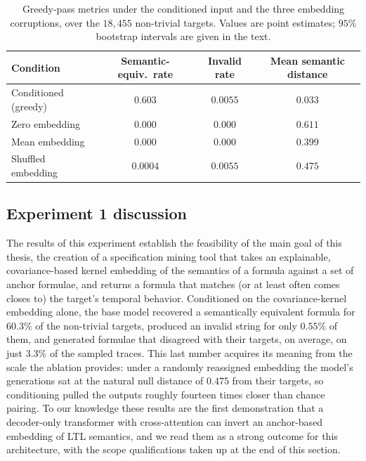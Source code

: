 \documentclass[titlepage,a4paper,11pt]{report}
\begin{document}
    \begin{table}[ht]
        \centering
        \caption{Greedy-pass metrics under the conditioned input and the three embedding corruptions, over the $18{,}455$ non-trivial targets. Values are point estimates; $95\%$ bootstrap intervals are given in the text.}
        \label{tab:exp1_ablation}
        \begin{tabular}{lccc}
            \toprule
            Condition & Semantic-equiv.\ rate & Invalid rate & Mean semantic distance \\
            \midrule
            Conditioned (greedy) & $0.603$   & $0.0055$ & $0.033$ \\
            Zero embedding       & $0.000$   & $0.000$  & $0.611$ \\
            Mean embedding       & $0.000$   & $0.000$  & $0.399$ \\
            Shuffled embedding   & $0.0004$  & $0.0055$ & $0.475$ \\
            \bottomrule
        \end{tabular}
    \end{table}

    \subsection{Experiment 1 discussion}\label{sec:exp1_discussion}
    The results of this experiment establish the feasibility of the main goal of this thesis, the creation of a specification mining tool that takes an explainable, covariance-based kernel embedding of the semantics of a formula against a set of anchor formulae, and returns a formula that matches (or at least often comes closes to) the target's temporal behavior. Conditioned on the covariance-kernel embedding alone, the base model recovered a semantically equivalent formula for $60.3\%$ of the non-trivial targets, produced an invalid string for only $0.55\%$ of them, and generated formulae that disagreed with their targets, on average, on just $3.3\%$ of the sampled traces. This last number acquires its meaning from the scale the ablation provides: under a randomly reassigned embedding the model's generations sat at the natural null distance of $0.475$ from their targets, so conditioning pulled the outputs roughly fourteen times closer than chance pairing. To our knowledge these results are the first demonstration that a decoder-only transformer with cross-attention can invert an anchor-based embedding of LTL semantics, and we read them as a strong outcome for this architecture, with the scope qualifications taken up at the end of this section.
\end{document}
